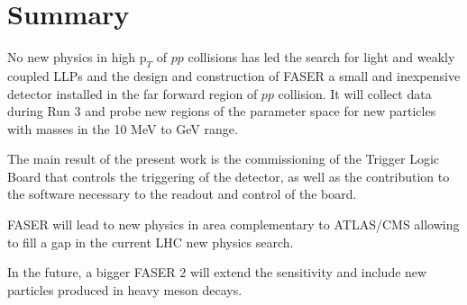\chapter{Summary}

\ifpdf
    \graphicspath{{Conclusion/Figs/Raster/}{Conclusion/Figs/PDF/}{Conclusion/Figs/}}
\else
    \graphicspath{{Conclusion/Figs/Vector/}{Conclusion/Figs/}}
\fi

No new physics in high $\text{p}_{T}$ of $pp$ collisions has led the search for light and weakly coupled LLPs and the design and construction of FASER a small and inexpensive detector installed in the far forward region of $pp$ collision. It will collect data during Run 3 and probe new regions of the parameter space for new particles with masses in the 10 MeV to GeV range.

The main result of the present work is the commissioning of the Trigger Logic Board that controls the triggering of the detector, as well as the contribution to the software necessary to the readout and control of the board.

FASER will lead to new physics in area complementary to ATLAS/CMS allowing to fill a gap in the current LHC new physics search.

In the future, a bigger FASER 2 will extend the sensitivity and include new particles produced in heavy meson decays.